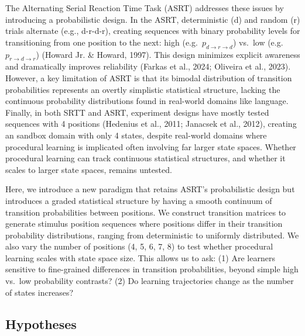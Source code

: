 \documentclass[
  10pt,
  letterpaper]{article}
\begin{document}
The Alternating Serial Reaction Time Task (ASRT) addresses these issues
by introducing a probabilistic design. In the ASRT, deterministic (d)
and random (r) trials alternate (e.g., d-r-d-r), creating sequences with
binary probability levels for transitioning from one position to the
next: high (e.g.~\(p_{d \rightarrow r \rightarrow d}\)) vs.~low
(e.g.~\(p_{r \rightarrow d \rightarrow r}\)) (Howard Jr. \& Howard,
1997). This design minimizes explicit awareness and dramatically
improves reliability (Farkas et al., 2024; Oliveira et al., 2023).
However, a key limitation of ASRT is that its bimodal distribution of
transition probabilities represents an overtly simplistic statistical
structure, lacking the continuous probability distributions found in
real-world domains like language. Finally, in both SRTT and ASRT,
experiment designs have mostly tested sequences with 4 positions
(Hedenius et al., 2011; Janacsek et al., 2012), creating an sandbox
domain with only 4 states, despite real-world domains where procedural
learning is implicated often involving far larger state spaces. Whether
procedural learning can track continuous statistical structures, and
whether it scales to larger state spaces, remains untested.

Here, we introduce a new paradigm that retains ASRT's probabilistic
design but introduces a graded statistical structure by having a smooth
continuum of transition probabilities between positions. We construct
transition matrices to generate stimulus position sequences where
positions differ in their transition probability distributions, ranging
from deterministic to uniformly distributed. We also vary the number of
positions (4, 5, 6, 7, 8) to test whether procedural learning scales
with state space size. This allows us to ask: (1) Are learners sensitive
to fine-grained differences in transition probabilities, beyond simple
high vs.~low probability contrasts? (2) Do learning trajectories change
as the number of states increases?

\subsection{Hypotheses}\label{hypotheses}
\end{document}
